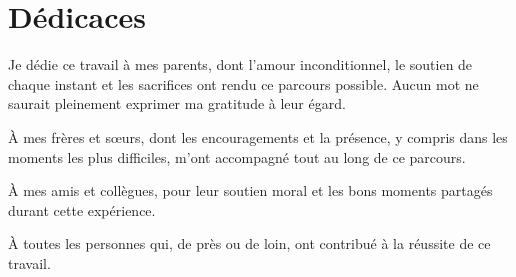 \chapter*{Dédicaces}

Je dédie ce travail à mes parents, dont l’amour inconditionnel, le soutien de chaque instant et les sacrifices ont rendu ce parcours possible. Aucun mot ne saurait pleinement exprimer ma gratitude à leur égard.

À mes frères et sœurs, dont les encouragements et la présence, y compris dans les moments les plus difficiles, m’ont accompagné tout au long de ce parcours.

À mes amis et collègues, pour leur soutien moral et les bons moments partagés durant cette expérience.

À toutes les personnes qui, de près ou de loin, ont contribué à la réussite de ce travail.
